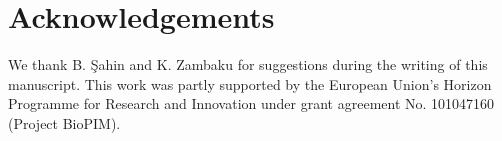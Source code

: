 \section*{Acknowledgements}
We thank B. Şahin and K. Zambaku for suggestions during the writing of this manuscript. This work was partly supported by the European Union’s Horizon Programme for Research and Innovation under grant agreement No. 101047160 (Project BioPIM).
